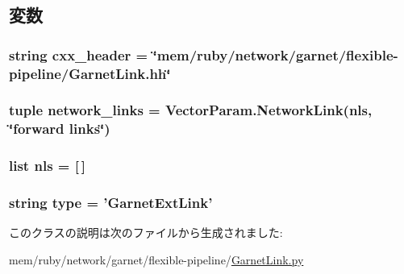 \subsection{変数}
\hypertarget{classGarnetLink_1_1GarnetExtLink_a17da7064bc5c518791f0c891eff05fda}{
\subsubsection[{cxx\_\-header}]{\setlength{\rightskip}{0pt plus 5cm}string {\bf cxx\_\-header} = \char`\"{}mem/ruby/network/garnet/flexible-\/pipeline/GarnetLink.hh\char`\"{}}}
\label{classGarnetLink_1_1GarnetExtLink_a17da7064bc5c518791f0c891eff05fda}
\hypertarget{classGarnetLink_1_1GarnetExtLink_a8bbf0848b3bec491562615b151d5c318}{
\subsubsection[{network\_\-links}]{\setlength{\rightskip}{0pt plus 5cm}tuple {\bf network\_\-links} = VectorParam.NetworkLink({\bf nls}, \char`\"{}forward links\char`\"{})}}
\label{classGarnetLink_1_1GarnetExtLink_a8bbf0848b3bec491562615b151d5c318}
\hypertarget{classGarnetLink_1_1GarnetExtLink_af11789bfc44615f3244deb3cf6054da9}{
\subsubsection[{nls}]{\setlength{\rightskip}{0pt plus 5cm}list {\bf nls} = \mbox{[}$\,$\mbox{]}}}
\label{classGarnetLink_1_1GarnetExtLink_af11789bfc44615f3244deb3cf6054da9}
\hypertarget{classGarnetLink_1_1GarnetExtLink_acce15679d830831b0bbe8ebc2a60b2ca}{
\subsubsection[{type}]{\setlength{\rightskip}{0pt plus 5cm}string {\bf type} = '{\bf GarnetExtLink}'}}
\label{classGarnetLink_1_1GarnetExtLink_acce15679d830831b0bbe8ebc2a60b2ca}


このクラスの説明は次のファイルから生成されました:\begin{DoxyCompactItemize}
\item 
mem/ruby/network/garnet/flexible-\/pipeline/\hyperlink{GarnetLink_8py}{GarnetLink.py}\end{DoxyCompactItemize}
